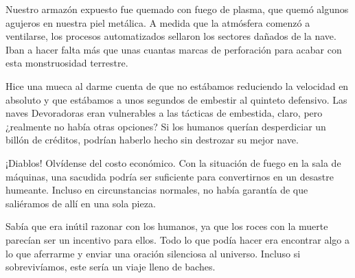 Nuestro armazón expuesto fue quemado con fuego de plasma, que quemó algunos agujeros en nuestra piel metálica. A medida que la atmósfera comenzó a ventilarse, los procesos automatizados sellaron los sectores dañados de la nave. Iban a hacer falta más que unas cuantas marcas de perforación para acabar con esta monstruosidad terrestre.

Hice una mueca al darme cuenta de que no estábamos reduciendo la velocidad en absoluto y que estábamos a unos segundos de embestir al quinteto defensivo. Las naves Devoradoras eran vulnerables a las tácticas de embestida, claro, pero ¿realmente no había otras opciones? Si los humanos querían desperdiciar un billón de créditos, podrían haberlo hecho sin destrozar su mejor nave.

¡Diablos! Olvídense del costo económico. Con la situación de fuego en la sala de máquinas, una sacudida podría ser suficiente para convertirnos en un desastre humeante. Incluso en circunstancias normales, no había garantía de que saliéramos de allí en una sola pieza.

Sabía que era inútil razonar con los humanos, ya que los roces con la muerte parecían ser un incentivo para ellos. Todo lo que podía hacer era encontrar algo a lo que aferrarme y enviar una oración silenciosa al universo. Incluso si sobrevivíamos, este sería un viaje lleno de baches.
